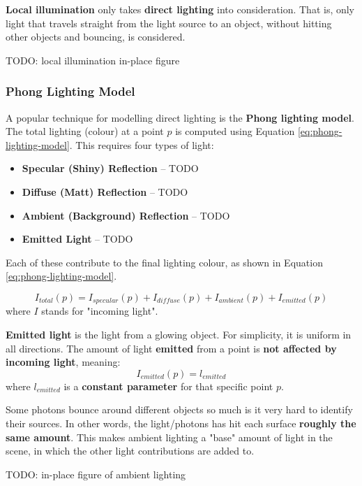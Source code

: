 \documentclass{article}
\begin{document}
\textbf{Local illumination} only takes \textbf{direct lighting} into consideration. That is, only light that travels straight from the light source to an object, without hitting other objects and bouncing, is considered.

TODO: local illumination in-place figure

\subsubsection{Phong Lighting Model}

A popular technique for modelling direct lighting is the \textbf{Phong lighting model}. The total lighting (colour) at a point $p$ is computed using Equation \ref{eq:phong-lighting-model}. This requires four types of light:
\begin{itemize}
	\item \textbf{Specular (Shiny) Reflection} -- TODO
	\item \textbf{Diffuse (Matt) Reflection} -- TODO
	\item \textbf{Ambient (Background) Reflection} -- TODO
	\item \textbf{Emitted Light} -- TODO
\end{itemize}
Each of these contribute to the final lighting colour, as shown in Equation \ref{eq:phong-lighting-model}.

\begin{equation}
	I_{total}(p) = I_{specular}(p) + I_{diffuse}(p) + I_{ambient}(p) + I_{emitted}(p)
	\label{eq:phong-lighting-model}
\end{equation}
where $I$ stands for "incoming light".

\textbf{Emitted light} is the light from a glowing object. For simplicity, it is uniform in all directions. The amount of light \textbf{emitted} from a point is \textbf{not affected by incoming light}, meaning:
\begin{equation}
	I_{emitted}(p) = l_{emitted}
	\label{eq:phong-emitted}
\end{equation}
where $l_{emitted}$ is a \textbf{constant parameter} for that specific point $p$.

Some photons bounce around different objects so much is it very hard to identify their sources. In other words, the light/photons has hit each surface \textbf{roughly the same amount}. This makes ambient lighting a "base" amount of light in the scene, in which the other light contributions are added to.

TODO: in-place figure of ambient lighting
\end{document}
